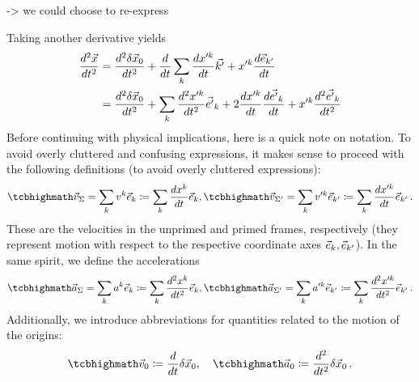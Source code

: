\documentclass[../class_mech_main.tex]{subfiles}
\begin{document}
-> we could choose to re-express


Taking another derivative yields
\begin{align}\label{eq:accel_non_inert_frame_v1}
	\dv[2]{\vec{x}}{t} &= \dv[2]{\delta \vec{x}_0}{t} + \dv{t} \sum_k \dv{x'^k}{t} \vec{k'} + x'^k \dv{\vec{e}_{k'}}{t}
	\\
	&= \dv[2]{\delta \vec{x}_0}{t} + \sum_k \dv[2]{x'^k}{t} \vec{e'}_k + 2 \dv{x'^k}{t} \dv{\vec{e'}_k}{t} + x'^k \dv[2]{\vec{e'}_k}{t}
\end{align}
Before continuing with physical implications, here is a quick note on notation. To avoid overly cluttered and confusing expressions, it makes sense to proceed with the following definitions (to avoid overly cluttered expressions):
\begin{equation}
	\eqbox{
		\vec{v}_\Sigma = \sum_k v^k \unitvec{k} \coloneqq \sum_k \dv{x^k}{t} \unitvec{k}
	},
	\eqbox{
		\vec{v}_{\Sigma'} = \sum_k v'^k \unitvec{k'} \coloneqq \sum_k \dv{x'^k}{t} \unitvec{k'}
	} \, .
\end{equation}
These are the velocities in the unprimed and primed frames, respectively (they represent motion with respect to the respective coordinate axes $\vec{e}_{k}, \vec{e}_{k'}$). In the same spirit, we define the accelerations
\begin{equation}
	\eqbox{
		\vec{a}_\Sigma = \sum_k a^k \unitvec{k} \coloneqq \sum_k \dv[2]{x^k}{t} \unitvec{k}
	},
	\eqbox{
		\vec{a}_{\Sigma'} = \sum_k a'^k \unitvec{k'} \coloneqq \sum_k \dv[2]{x'^k}{t} \unitvec{k'}
	}
	\, .
\end{equation}
Additionally, we introduce abbreviations for quantities related to the motion of the origins:
\begin{equation}
	\eqbox{
		\vec{v}_0 \coloneqq \dv{t} \delta \vec{x}_0
	}, \quad
	\eqbox{
		\vec{a}_0 \coloneqq \dv[2]{t} \delta \vec{x}_0
	} \, .
\end{equation}
\end{document}
